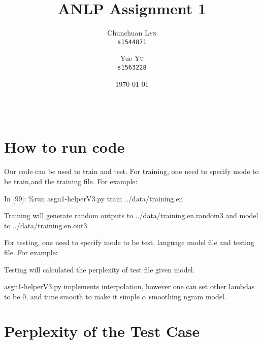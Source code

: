 \documentclass{article}
\title{ANLP Assignment 1} %
\author{
	Chunchuan \textsc{Lyn}\\
	\texttt{s1544871}
	\and
	Yue \textsc{Yu}\\
	\texttt{s1563228}
}
\date{\today} %
\begin{document}
\maketitle %

\begin{center}
\begin{tabular}{l r}
\end{tabular}
\end{center}

\section{How to run code}
Our code can be used to train and test. For training, one need to specify mode to be train,and the training file.
For example:
\begin{center}
\centering
{In [99]: \%run asgn1-helperV3.py  train  ../data/training.en}
\end{center} 
Training will generate random outputs to ../data/training.en.random3
and model to ../data/training.en.out3

For testing, one need to specify mode to be test, language model file and testing file.
For example:
\begin{center}
\end{center}
Testing will calculated the perplexity of test file given model.

asgn1-helperV3.py implements interpolation, however one can set other lambdas to be 0, and tune smooth to make it simple $\alpha$ smoothing ngram model.
\section{Perplexity of the Test Case}
	
\end{document}
